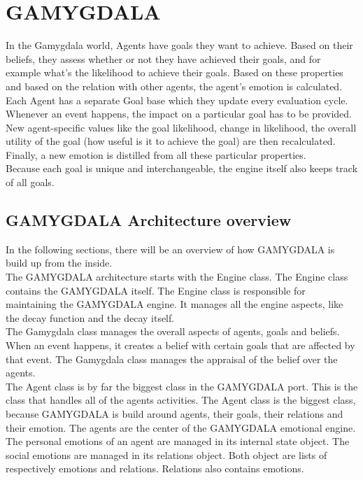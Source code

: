 \section{GAMYGDALA}
In the Gamygdala world, Agents have goals they want to achieve. Based on their beliefs, they assess whether or not they have achieved their goals, and for example what's the likelihood to achieve their goals. Based on these properties and based on the relation with other agents, the agent's emotion is calculated. \\ 

Each Agent has a separate Goal base which they update every evaluation cycle. Whenever an event happens, the impact on a particular goal has to be provided. New agent-specific values like the goal likelihood, change in likelihood, the overall utility of the goal (how useful is it to achieve the goal) are then recalculated. Finally, a new emotion is distilled from all these particular properties. \\

Because each goal is unique and interchangeable, the engine itself also keeps track of all goals. \\

\subsection{GAMYGDALA Architecture overview}
In the following sections, there will be an overview of how GAMYGDALA is build up from the inside. \\

The GAMYGDALA architecture starts with the Engine class. The Engine class contains the GAMYGDALA itself. The Engine class is responsible for maintaining the GAMYGDALA engine. It manages all the engine aspects, like the decay function and the decay itself. \\

The Gamygdala class manages the overall aspects of agents, goals and beliefs. When an event happens, it creates a belief with certain goals that are affected by that event. The Gamygdala class manages the appraisal of the belief over the agents. \\

The Agent class is by far the biggest class in the GAMYGDALA port. This is the class that handles all of the agents activities. The Agent class is the biggest class, because GAMYGDALA is build around agents, their goals, their relations and their emotion. The agents are the center of the GAMYGDALA emotional engine. The personal emotions of an agent are managed in its internal state object. The social emotions are managed in its relations object. Both object are lists of respectively emotions and relations. Relations also contains emotions. \\

